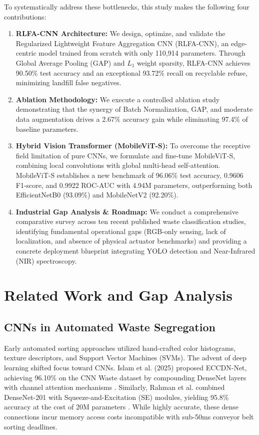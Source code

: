 \documentclass[conference]{IEEEtran}
\begin{document}
To systematically address these bottlenecks, this study makes the following four contributions:
\begin{enumerate}
    \item \textbf{RLFA-CNN Architecture:} We design, optimize, and validate the Regularized Lightweight Feature Aggregation CNN (RLFA-CNN), an edge-centric model trained from scratch with only 110,914 parameters. Through Global Average Pooling (GAP) and $L_1$ weight sparsity, RLFA-CNN achieves 90.50\% test accuracy and an exceptional 93.72\% recall on recyclable refuse, minimizing landfill false negatives.
    \item \textbf{Ablation Methodology:} We execute a controlled ablation study demonstrating that the synergy of Batch Normalization, GAP, and moderate data augmentation drives a 2.67\% accuracy gain while eliminating 97.4\% of baseline parameters.
    \item \textbf{Hybrid Vision Transformer (MobileViT-S):} To overcome the receptive field limitation of pure CNNs, we formulate and fine-tune MobileViT-S, combining local convolutions with global multi-head self-attention. MobileViT-S establishes a new benchmark of 96.06\% test accuracy, 0.9606 F1-score, and 0.9922 ROC-AUC with 4.94M parameters, outperforming both EfficientNetB0 (93.09\%) and MobileNetV2 (92.20\%).
    \item \textbf{Industrial Gap Analysis \& Roadmap:} We conduct a comprehensive comparative survey across ten recent published waste classification studies, identifying fundamental operational gaps (RGB-only sensing, lack of localization, and absence of physical actuator benchmarks) and providing a concrete deployment blueprint integrating YOLO detection and Near-Infrared (NIR) spectroscopy.
\end{enumerate}

\section{Related Work and Gap Analysis}

\subsection{CNNs in Automated Waste Segregation}
Early automated sorting approaches utilized hand-crafted color histograms, texture descriptors, and Support Vector Machines (SVMs). The advent of deep learning shifted focus toward CNNs. Islam et al. (2025) proposed ECCDN-Net, achieving 96.10\% on the CNN Waste dataset by compounding DenseNet layers with channel attention mechanisms \cite{islam2025eccdn}. Similarly, Rahman et al. combined DenseNet-201 with Squeeze-and-Excitation (SE) modules, yielding 95.8\% accuracy at the cost of 20M parameters \cite{rahman2024}. While highly accurate, these dense connections incur memory access costs incompatible with sub-50ms conveyor belt sorting deadlines.
\end{document}
